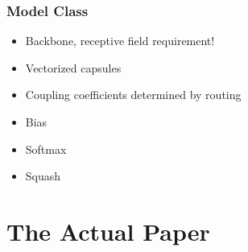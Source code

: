 \documentclass{article}
\begin{document}
\subsubsection*{Model Class}
\begin{itemize}
	\item Backbone, receptive field requirement!
	\item Vectorized capsules
	\item Coupling coefficients determined by routing
	\item Bias
	\item Softmax
	\item Squash
\end{itemize}


\section{The Actual Paper}
\end{document}
